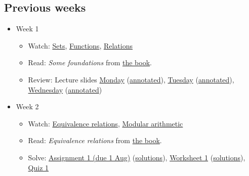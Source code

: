 \documentclass{amsart}
\begin{document}
\subsection{Previous weeks}
\label{sec:org609df9d}
\begin{itemize}
\item Week 1
\begin{itemize}
\item Watch: \href{https://canvas.anu.edu.au/files/704425}{Sets}, \href{https://canvas.anu.edu.au/files/704426}{Functions}, \href{https://canvas.anu.edu.au/files/704427}{Relations}
\item Read: \emph{Some foundations} from \href{https://canvas.anu.edu.au/files/715877/}{the book}.
\item Review: Lecture slides \href{https://canvas.anu.edu.au/files/706185/download?download\_frd=1\&verifier=oH0NrvZ7LbdvqBTLCREnQieT56jtJVyT0qgmxrxc}{Monday} (\href{https://canvas.anu.edu.au/files/706185/download?download\_frd=1\&verifier=oH0NrvZ7LbdvqBTLCREnQieT56jtJVyT0qgmxrxc}{annotated}), \href{https://canvas.anu.edu.au/files/707643/download?download\_frd=1\&verifier=Ccbb9TJyYV7iqgvDuWwHJLkjmU8ES6gfsvGGjNpA}{Tuesday} (\href{https://canvas.anu.edu.au/files/709624/download?download\_frd=1\&verifier=ilS5t91IGkqJTyF0PJ24H2Tw11Aor8vFwpWSUJwM}{annotated}), \href{https://canvas.anu.edu.au/files/709623/download?download\_frd=1\&verifier=FLp3XgnYWV6lZ5Kn1qCY0FJ7CC34czJ5J8yjlO5V}{Wednesday} (\href{https://canvas.anu.edu.au/files/709622/download?download\_frd=1\&verifier=86i1plXUX4ANR6PiOZZelkUEvMXaoY16NBLPTwLT}{annotated})
\end{itemize}
\item Week 2
\begin{itemize}
\item Watch: \href{https://canvas.anu.edu.au/files/706765}{Equivalence relations}, \href{https://canvas.anu.edu.au/files/706767}{Modular arithmetic}
\item Read: \emph{Equivalence relations} from \href{https://canvas.anu.edu.au/files/715877/}{the book}.
\item Solve: \href{https://canvas.anu.edu.au/files/709890/download?download\_frd=1\&verifier=RmLFJ3uhBGI4m8RlXGPr2BhC8ejjpGmaz3ZypFZx}{Assignment 1 (due 1 Aug)} (\href{https://canvas.anu.edu.au/files/733279/download?download\_frd=1\&verifier=oqhBYwaOkWepdASEvBKakyzbq7Aw7Sgglbf7JZK6}{solutions}), \href{https://canvas.anu.edu.au/files/715135/download?download\_frd=1\&verifier=qZXMO7vBnxUkyQ70jQuHX7l3bPelONzvtQ8YBjHt}{Worksheet 1} (\href{https://canvas.anu.edu.au/files/733257/download?download\_frd=1\&verifier=TkxTB474Whc3QcrPZw0SjxbGRauTW1tTwORZKUZT}{solutions}), \href{https://canvas.anu.edu.au/files/722147/download?download\_frd=1\&verifier=Mc76QZ7klU5HTpW5UO7QvdOn1eRHnQnNnnF59jUx}{Quiz 1}

\end{itemize}
\end{itemize}
\end{document}
